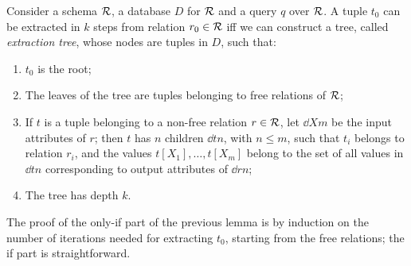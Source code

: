 \begin{lemma} \label{lem:extraction-tree}
  Consider a schema $\mathcal{R}$, a database $D$ for $\mathcal{R}$ and a query $q$ over
  $\mathcal{R}$. A tuple $t_0$ can be extracted in $k$ steps from relation $r_{0}\in\mathcal{R}$
iff
we can construct a tree, called \emph{extraction tree}, whose nodes are
  tuples in $D$, such that:
  \begin{enumerate}
  \item $t_0$ is the root;
  \item The leaves of the tree are tuples belonging to free relations of $\mathcal{R}$;
  \item If $t$ is a tuple belonging to a non-free relation $r\in\mathcal{R}$, let $\dd{X}{m}$
    be the input attributes of $r$; then $t$ has $n$ children $\dd{t}{n}$, with
    $n \leq m$, such that $t_i$ belongs to relation $r_i$, and the values
    $t[X_1],\ldots,t[X_m]$ belong to the set of all values in $\dd{t}{n}$
    corresponding to output attributes of $\dd{r}{n}$;
  \item The tree has depth $k$.
  \end{enumerate}
\end{lemma}
The proof of the only-if part of the previous lemma is by induction on the number of iterations needed for extracting $t_0$, starting from the free relations; the if part is straightforward.
%
%  
%  
%  
